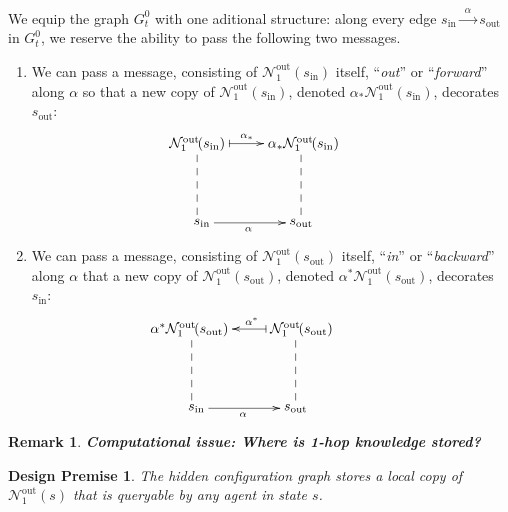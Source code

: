 \documentclass[11pt]{article}
\newtheorem{remark}{Remark}[subsection]
\newtheorem{premise}{Design Premise}
\begin{document}
We equip the graph $G^{0}_{t}$ with one aditional structure: along every edge $s_{\text{in}}\xrightarrow{\ \ \alpha\ \ }s_{\text{out}}$ in $G^{0}_{t}$, we reserve the ability to pass the following two messages.
\begin{enumerate}
\item
We can pass a message, consisting of  $\mathcal{N}^{\text{out}\!}_{1}(s_{\text{in}})$ itself, ``{\em out}'' or ``{\em forward}'' along $\alpha$ so that a new copy of $\mathcal{N}^{\text{out}\!}_{1}(s_{\text{in}})$, denoted $\alpha_\ast\mathcal{N}^{\text{out}\!}_{1}(s_{\text{in}})$, decorates $s_{\text{out}}$:
$$
\!\!\!\!\!\!\!\!\!\!\!\!\!\!\!\!\!\!\!\!\!
\begin{xy}
(0,0)*+{\mathcal{N}^{\text{out}\!}_{1}(s_{\text{in}})}="1";
(25,0)*+{\alpha_\ast\mathcal{N}^{\text{out}\!}_{1}(s_{\text{in}})\!\!\!\!\!\!}="2";
(0,-20)*+{s_\text{in}\!\!\!\!}="3";
(25,-20)*+{\ \ s_\text{out}}="4";
{\ar@{|->}^{\alpha_\ast} "1"; "2"}
{\ar@{--} "1"; "3"}
{\ar@{--} "2"; "4"}
{\ar@{->}_{\!\!\!\!\!\!\!\!\alpha} "3"; "4"}
\end{xy}
$$
\item
We can pass a message, consisting of  $\mathcal{N}^{\text{out}\!}_{1}(s_{\text{out}})$ itself, ``{\em in}'' or ``{\em backward}'' along $\alpha$ that a new copy of $\mathcal{N}^{\text{out}\!}_{1}(s_{\text{out}})$, denoted $\alpha^{\ast}\mathcal{N}^{\text{out}\!}_{1}(s_{\text{out}})$, decorates $s_{\text{in}}$:
$$
\!\!\!\!\!\!\!\!\!\!\!\!\!\!\!\!\!\!\!\!\!
\!\!\!\!\!\!\!\!\!\!\!\!
\begin{xy}
(0,0)*+{\!\!\alpha^{\ast}\mathcal{N}^{\text{out}\!}_{1}(s_{\text{out}})}="1";
(25,0)*+{\mathcal{N}^{\text{out}\!}_{1}(s_{\text{out}})\!\!\!\!\!\!\!\!\!}="2";
(0,-20)*+{s_\text{in}\!\!\!\!}="3";
(25,-20)*+{\ \ s_\text{out}}="4";
{\ar@{|->}_{\ \ \alpha^\ast\!\!\!\!\!\!} "2"; "1"}
{\ar@{--} "1"; "3"}
{\ar@{--} "2"; "4"}
{\ar@{->}_{\!\!\!\!\!\!\!\!\alpha} "3"; "4"}
\end{xy}
$$
\end{enumerate}

\begin{remark}
{\bf Computational issue: Where is 1-hop knowledge stored?}
\normalfont
[...]
\end{remark}

\begin{premise}
The hidden configuration graph stores a local copy of $\mathcal{N}^{\text{out}\!}_{1}(s)$ that is queryable by any agent in state $s$.
\end{premise}
\end{document}
